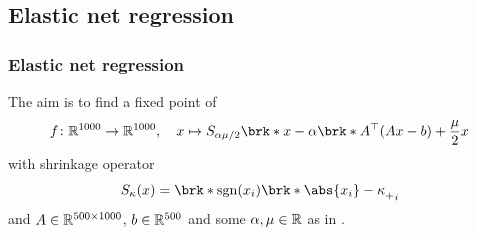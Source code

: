 %
%
%		
%
%
%		

\subsection{Elastic net regression}

\begin{frame}
	\frametitle{Elastic net regression}
	The aim is to find a fixed point of
	\begin{align*}
		f\colon\R^{1000}\to\R^{1000}, \quad x\mapsto S_{\alpha\mu/2}\brk*{x-\alpha\brk*{A^\top(Ax-b)+\frac{\mu}{2}x}}
	\end{align*}
	with shrinkage operator
	\begin{align*}
		S_\kappa(x) = \brk*{\sgn(x_i)\brk*{\abs{x_i}-\kappa}_+}_i
	\end{align*}
	and $A\in\mathbb{R}^{500\times 1000}$, $b\in\mathbb{R}^{500}$ and some $\alpha, \mu\in\mathbb{R}$ as in \cite{ZhaAA}.
\end{frame}


